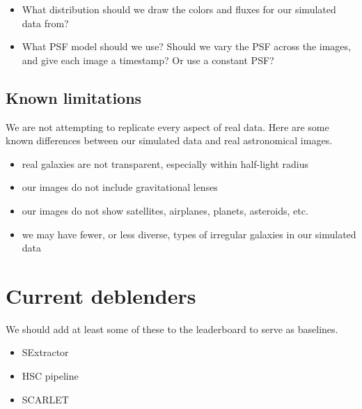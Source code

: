 \documentclass[10pt,letter]{article}
\newcommand{\jr}[1]{{\color{blue}[JR] #1}}
\begin{document}
\begin{itemize}
\jr{3. Even for the Netflix prize (\$1 million prize) they banned using ``external'' information for predicting movie ratings, so a ban like this wouldn't be unprecedented. The winners had to submit their code to collect the prize so it was easily verified.}\\
\jr{4. If you can generate unlimited labeled data, you can just train a deep neural network to produce the right label for the data. You wouldn't even need to use the supplied training set, which wouldn't have labels, to train your algorithm. So somehow we have to keep users from generated their own labeled datasets---I think that means keeping the simulator secret or off limits}
\item What distribution should we draw the colors and fluxes for our simulated data from?
\item What PSF model should we use? Should we vary the PSF across the images, and give each image a timestamp? Or use a constant PSF?
\end{itemize}


\subsection{Known limitations}
We are not attempting to replicate every aspect of real data. Here are some known differences between our simulated data and real astronomical images.
\begin{itemize}
\item real galaxies are not transparent, especially within half-light radius
\item our images do not include gravitational lenses
\item our images do not show satellites, airplanes, planets, asteroids, etc.
\item we may have fewer, or less diverse, types of irregular galaxies in our simulated data
\end{itemize}


\section{Current deblenders}
We should add at least some of these to the leaderboard to serve as baselines.

\begin{itemize}
    \item SExtractor~\cite{bertin1996sextractor}
    \item HSC pipeline~\cite{bosch2018hyper}
    \item SCARLET~\cite{melchior2018scarlet}
\end{itemize}

{}

\end{document}
